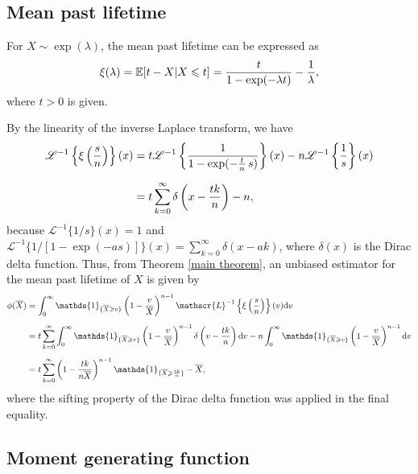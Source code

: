 \documentclass[12pt]{article}
\theoremstyle{definition}
\begin{document}
\subsection{Mean past lifetime}

For  $X\sim\exp(\lambda)$, the mean past lifetime can be expressed as
\begin{align*}
	\xi(\lambda)=\mathbb{E}[t-X\vert X\leqslant t]
	=
	{t\over 1-\exp(-\lambda t)}-{1\over\lambda},
\end{align*}
where $t>0$ is given. 

By the linearity of the inverse Laplace transform, we have
\begin{align}\label{def-prop-1}
	\mathscr{L}^{-1}\left\{	
	{\displaystyle \xi\left({s\over n}\right)}
	\right\}
	(x)
	&=
	t
	\mathscr{L}^{-1}\left\{	
	{1\over 1-\exp(-{t\over n} \, s)}
	\right\}
	(x)
	- 
	n
	\mathscr{L}^{-1}\left\{{1\over s}
	\right\}
	(x)
	\nonumber
	\\[0,2cm]
	&=
	t
	\sum_{k=0}^\infty 
	\delta\left(x-{tk\over n}\right)
	- 
	n,
\end{align}
because $\mathscr{L}^{-1}\{1/s\}(x)=1$ and 
$\mathscr{L}^{-1}\{{1/[1-\exp(-as)]}\}(x)=\sum_{k=0}^\infty \delta\left(x-{a k}\right)$,  where $\delta(x)$ is the Dirac delta function.
Thus, from Theorem \ref{main theorem}, an unbiased estimator for the mean past lifetime of  $X$ is given by
\begin{align*}
	\phi(\overline{X})
	&=
	\int_0^{\infty} 
	\mathds{1}_{\{\overline{X}\geqslant v\}}
	\left(1-{v\over \overline{X}}\right)^{n-1} 
	\mathscr{L}^{-1}\left\{\xi\left({s\over n}\right)
	\right\}(v){\rm d}v
	\\[0,2cm]
	&=
	t
	\sum_{k=0}^\infty 
	\int_0^{\infty} 
	\mathds{1}_{\{\overline{X}\geqslant v\}}
	\left(1-{v\over \overline{X}}\right)^{n-1} 
	\delta\left(v-{tk\over n}\right)
	{\rm d}v   
	-
	n
	\int_0^{\infty} 
	\mathds{1}_{\{\overline{X}\geqslant v\}}
	\left(1-{v\over \overline{X}}\right)^{n-1} 
	{\rm d}v  
	\\[0,2cm]
	&=
	t
	\sum_{k=0}^\infty 
	\left(1-{tk\over n \overline{X}}\right)^{n-1}
	\mathds{1}_{\{\overline{X}\geqslant {tk\over n}\}}
	-
	\overline{X},
\end{align*}
where the sifting property of the Dirac delta function was applied in the final equality.






\subsection{Moment generating function}
\label{Unbiased estimator for the moment generating function}
\end{document}
